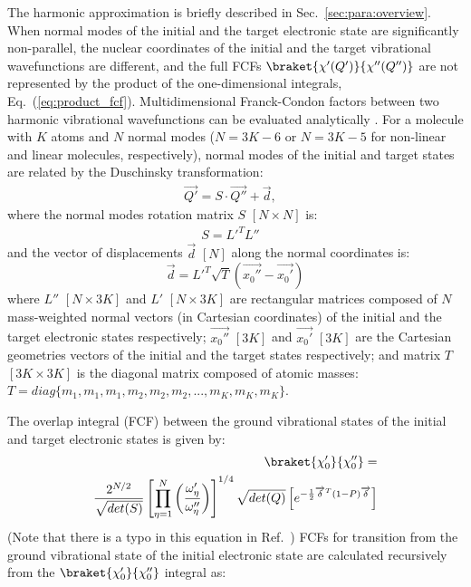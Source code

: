 \documentclass[11pt]{article}
\begin{document}
The harmonic approximation is briefly described in Sec.~\ref{sec:para:overview}.
When normal modes of the initial and the target electronic state are significantly non-parallel,
the nuclear coordinates of the initial and the target vibrational wavefunctions are different,
and the full FCFs $\braket{\chi '(Q')}{\chi'' (Q'')}$ 
are not represented by the product of the one-dimensional integrals, Eq.~(\ref{eq:product_fcf}).
Multidimensional Franck-Condon factors between two harmonic vibrational wavefunctions
can be evaluated analytically \cite{Kupka:FC:86,Duschinsky:math:98}.
For a molecule with $K$ atoms and $N$ normal modes 
($N=3K-6$ or $N=3K-5$ for non-linear and linear molecules, respectively),
normal modes of the initial and target states are related by the Duschinsky transformation\cite{Duschinky:37}:
\begin{align}
\overrightarrow{Q'}=S\cdot\overrightarrow{Q''}+\overrightarrow{d},&
\label{eq:dushinsky}
\end{align}
where the normal modes rotation matrix $S$ $[N\times N]$ is:
\begin{align}
S=L'^TL''&\nonumber
\end{align}
and the vector of displacements $\overrightarrow{d}$ $[N]$ along the normal coordinates is:
\begin{equation}
\label{eq:displacement_vec}
\overrightarrow{d}=L'^T\sqrt{T}(\overrightarrow{x_0''}-\overrightarrow{x_0'})
\end{equation}
where $L''$ $[N\times 3K]$ and $L'$ $[N\times 3K]$ are rectangular matrices composed of $N$ mass-weighted normal vectors
(in Cartesian coordinates) of the initial and the target electronic states respectively;
$\overrightarrow{x_0''}$ $[3K]$ and $\overrightarrow{x_0'}$ $[3K]$ are the Cartesian geometries vectors
of the initial and the target states respectively; and matrix $T$ $[3K\times 3K]$ 
is the diagonal matrix composed of atomic masses: $T=diag\{m_1,m_1,m_1,m_2,m_2,m_2,...,m_K,m_K,m_K\}$.

The overlap integral (FCF) between the ground vibrational states of the initial and target electronic states is
given by\cite{Duschinsky:math:98}:
\begin{align}
\braket{\chi'_0}{\chi''_0}=&\nonumber\\
\frac{2^{N/2}}{\sqrt{det(S)}}
\left[ \prod_{\eta=1}^{N} \left(\frac{\omega'_{\eta}}{\omega''_{\eta}}\right)  \right]^{1/4}
\sqrt{det(Q)}
\left[e^{-\frac{1}{2}\overrightarrow{\delta}^T(1-P)\overrightarrow{\delta}} \right]&
\end{align}
(Note that there is a typo in this equation in Ref.~\cite{Duschinsky:math:98})
FCFs for transition from the ground vibrational state of the initial electronic 
state are calculated recursively\cite{Duschinsky:math:98} from the 
$\braket{\chi'_0}{\chi''_0}$ integral as:
\end{document}

